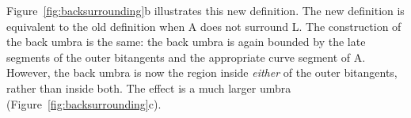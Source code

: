 \documentclass[9pt,twocolumn]{article}
\newif\ifSurrounding    %
\begin{document}
Figure~\ref{fig:backsurrounding}b illustrates this new definition.
The new definition is equivalent to the old definition when A does not surround L.
The construction of the back umbra is the same:
the back umbra is again bounded by the late segments of the outer bitangents
and the appropriate curve segment of A.
However, the back umbra is now the region inside {\em either} of the outer bitangents, 
rather than inside both.
The effect is a much larger umbra (Figure~\ref{fig:backsurrounding}c).
\fi




\end{document}
